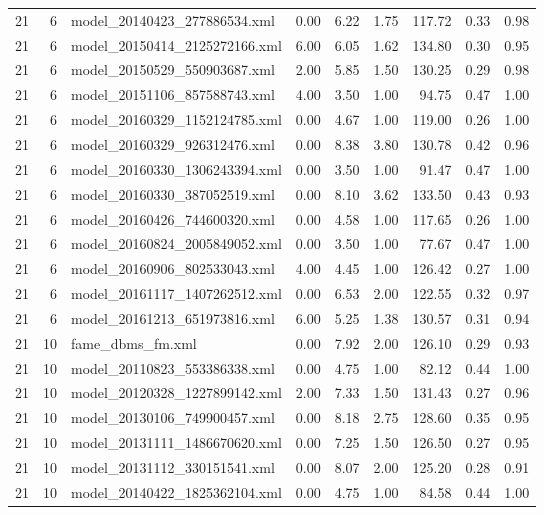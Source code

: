 \begin{table}[ht]
\begin{tabular}{rrlrrrrrr}
   21 &   6 & model\_20140423\_277886534.xml & 0.00 & 6.22 & 1.75 & 117.72 & 0.33 & 0.98 \\ 
   21 &   6 & model\_20150414\_2125272166.xml & 6.00 & 6.05 & 1.62 & 134.80 & 0.30 & 0.95 \\ 
   21 &   6 & model\_20150529\_550903687.xml & 2.00 & 5.85 & 1.50 & 130.25 & 0.29 & 0.98 \\ 
   21 &   6 & model\_20151106\_857588743.xml & 4.00 & 3.50 & 1.00 & 94.75 & 0.47 & 1.00 \\ 
   21 &   6 & model\_20160329\_1152124785.xml & 0.00 & 4.67 & 1.00 & 119.00 & 0.26 & 1.00 \\ 
   21 &   6 & model\_20160329\_926312476.xml & 0.00 & 8.38 & 3.80 & 130.78 & 0.42 & 0.96 \\ 
   21 &   6 & model\_20160330\_1306243394.xml & 0.00 & 3.50 & 1.00 & 91.47 & 0.47 & 1.00 \\ 
   21 &   6 & model\_20160330\_387052519.xml & 0.00 & 8.10 & 3.62 & 133.50 & 0.43 & 0.93 \\ 
   21 &   6 & model\_20160426\_744600320.xml & 0.00 & 4.58 & 1.00 & 117.65 & 0.26 & 1.00 \\ 
   21 &   6 & model\_20160824\_2005849052.xml & 0.00 & 3.50 & 1.00 & 77.67 & 0.47 & 1.00 \\ 
   21 &   6 & model\_20160906\_802533043.xml & 4.00 & 4.45 & 1.00 & 126.42 & 0.27 & 1.00 \\ 
   21 &   6 & model\_20161117\_1407262512.xml & 0.00 & 6.53 & 2.00 & 122.55 & 0.32 & 0.97 \\ 
   21 &   6 & model\_20161213\_651973816.xml & 6.00 & 5.25 & 1.38 & 130.57 & 0.31 & 0.94 \\ 
   21 &  10 & fame\_dbms\_fm.xml & 0.00 & 7.92 & 2.00 & 126.10 & 0.29 & 0.93 \\ 
   21 &  10 & model\_20110823\_553386338.xml & 0.00 & 4.75 & 1.00 & 82.12 & 0.44 & 1.00 \\ 
   21 &  10 & model\_20120328\_1227899142.xml & 2.00 & 7.33 & 1.50 & 131.43 & 0.27 & 0.96 \\ 
   21 &  10 & model\_20130106\_749900457.xml & 0.00 & 8.18 & 2.75 & 128.60 & 0.35 & 0.95 \\ 
   21 &  10 & model\_20131111\_1486670620.xml & 0.00 & 7.25 & 1.50 & 126.50 & 0.27 & 0.95 \\ 
   21 &  10 & model\_20131112\_330151541.xml & 0.00 & 8.07 & 2.00 & 125.20 & 0.28 & 0.91 \\ 
   21 &  10 & model\_20140422\_1825362104.xml & 0.00 & 4.75 & 1.00 & 84.58 & 0.44 & 1.00 \\ 

\end{tabular}
\end{table}
